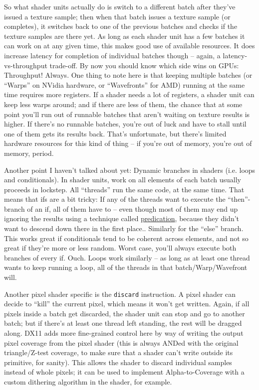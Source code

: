 \documentclass[12pt]{article}
\begin{document}
So what shader units actually do is switch to a different batch after they’ve issued a texture sample; then when that batch issues a texture sample (or completes), it switches back to one of the previous batches and checks if the texture samples are there yet. As long as each shader unit has a few batches it can work on at any given time, this makes good use of available resources. It does increase latency for completion of individual batches though – again, a latency-vs-throughput trade-off. By now you should know which side wins on GPUs: Throughput! Always. One thing to note here is that keeping multiple batches (or “Warps” on NVidia hardware, or “Wavefronts” for AMD) running at the same time requires more registers. If a shader needs a lot of registers, a shader unit can keep less warps around; and if there are less of them, the chance that at some point you’ll run out of runnable batches that aren’t waiting on texture results is higher. If there’s no runnable batches, you’re out of luck and have to stall until one of them gets its results back. That’s unfortunate, but there’s limited hardware resources for this kind of thing – if you’re out of memory, you’re out of memory, period.

Another point I haven’t talked about yet: Dynamic branches in shaders (i.e. loops and conditionals). In shader units, work on all elements of each batch usually proceeds in lockstep. All “threads” run the same code, at the same time. That means that ifs are a bit tricky: If any of the threads want to execute the “then”-branch of an if, all of them have to – even though most of them may end up ignoring the results using a technique called \href{http://en.wikipedia.org/wiki/Branch\_predication}{predication}, because they didn’t want to descend down there in the first place.. Similarly for the “else” branch. This works great if conditionals tend to be coherent across elements, and not so great if they’re more or less random. Worst case, you’ll always execute both branches of every if. Ouch. Loops work similarly – as long as at least one thread wants to keep running a loop, all of the threads in that batch/Warp/Wavefront will.

Another pixel shader specific is the \texttt{discard} instruction. A pixel shader can decide to “kill” the current pixel, which means it won’t get written. Again, if all pixels inside a batch get discarded, the shader unit can stop and go to another batch; but if there’s at least one thread left standing, the rest will be dragged along. DX11 adds more fine-grained control here by way of writing the output pixel coverage from the pixel shader (this is always ANDed with the original triangle/Z-test coverage, to make sure that a shader can’t write outside its primitive, for sanity). This allows the shader to discard individual samples instead of whole pixels; it can be used to implement Alpha-to-Coverage with a custom dithering algorithm in the shader, for example.
\end{document}

